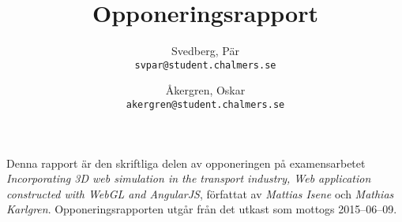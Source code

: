 \documentclass[a4paper, 11pt]{article}
\author{
    Svedberg, Pär \\ \texttt{svpar@student.chalmers.se}
    \and
    Åkergren, Oskar \\ \texttt{akergren@student.chalmers.se}
}
\title{\vspace{-3cm}Opponeringsrapport}
\begin{document}
\maketitle
\vspace{-0.5cm}Denna rapport är den skriftliga delen av opponeringen på examensarbetet \emph{Incorporating 3D web simulation in the transport industry, Web application constructed with WebGL and AngularJS}, författat av \emph{Mattias Isene} och \emph{Mathias Karlgren}. Opponerings\-rapporten utgår från det utkast som mottogs 2015--06--09.



\newpage

\end{document}
